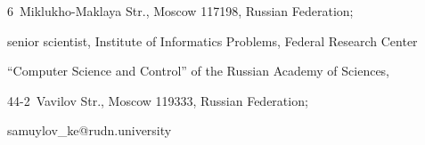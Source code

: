  6~Miklukho-Maklaya Str., Moscow 117198, Russian Federation; 


 senior scientist, Institute of Informatics Problems, Federal Research Center 


 ``Computer Science and Control'' of the Russian Academy of Sciences, 


 44-2~Vavilov Str., Moscow 119333, Russian Federation; 


 \mbox{samuylov\_ke@rudn.university}








\label{end\stat}








\renewcommand{\bibname}{\protect\rm Литература}


